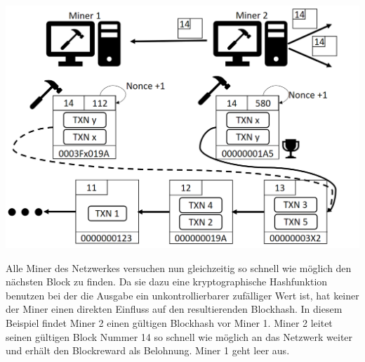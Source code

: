 \vspace{1cm}
\begin{minipage}{0.55\textwidth}
\includegraphics[width=\textwidth]{Figures/konzept_btc/konzept9}
\centering
\decoRule
{}
\label{fig:konzept9}
\end{minipage}
\begin{minipage}{0.45\textwidth}
Alle Miner des Netzwerkes versuchen nun gleichzeitig so schnell wie möglich den nächsten Block zu finden. Da sie dazu eine kryptographische Hashfunktion benutzen bei der die Ausgabe ein unkontrollierbarer zufälliger Wert ist, hat keiner der Miner einen direkten Einfluss auf den resultierenden Blockhash. In diesem Beispiel findet Miner 2 einen gültigen Blockhash vor Miner 1. Miner 2 leitet seinen gültigen Block Nummer 14 so schnell wie möglich an das Netzwerk weiter und erhält den Blockreward als Belohnung. Miner 1 geht leer aus.
\end{minipage}

